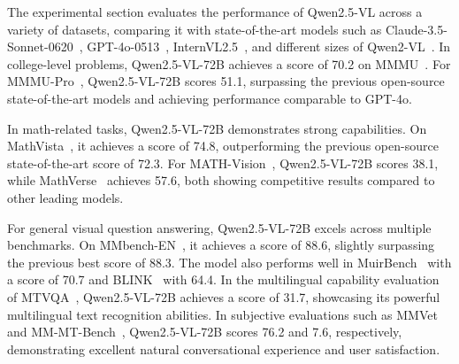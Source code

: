 \begin{table}[h]
{\begin{tabular}{@{}lcccccccc@{}}
\bottomrule
\end{tabular}
}
\end{table}

The experimental section evaluates the performance of Qwen2.5-VL across a variety of datasets, comparing it with state-of-the-art models such as Claude-3.5-Sonnet-0620~\citep{sonnet3_5}, GPT-4o-0513~\citep{gpt4o}, InternVL2.5~\citep{chen2024expanding}, and different sizes of Qwen2-VL~\citep{Qwen2-VL}. In college-level problems, Qwen2.5-VL-72B achieves a score of 70.2 on MMMU~\citep{yue2023mmmu}. For MMMU-Pro~\citep{mmmupro}, Qwen2.5-VL-72B scores 51.1, surpassing the previous open-source state-of-the-art models and achieving performance comparable to GPT-4o.

In math-related tasks, Qwen2.5-VL-72B demonstrates strong capabilities. On MathVista~\citep{mathvista}, it achieves a score of 74.8, outperforming the previous open-source state-of-the-art score of 72.3. For MATH-Vision~\citep{mathvision}, Qwen2.5-VL-72B scores 38.1, while MathVerse~\citep{zhang2024mathverse} achieves 57.6, both showing competitive results compared to other leading models.

For general visual question answering, Qwen2.5-VL-72B excels across multiple benchmarks. On MMbench-EN~\citep{MMBench}, it achieves a score of 88.6, slightly surpassing the previous best score of 88.3. The model also performs well in MuirBench~\citep{wang2024muirbench} with a score of 70.7 and BLINK~\citep{fu2024blink} with 64.4. In the multilingual capability evaluation of MTVQA~\citep{tang2024mtvqa}, Qwen2.5-VL-72B achieves a score of 31.7, showcasing its powerful multilingual text recognition abilities. In subjective evaluations such as MMVet~\citep{yu2024mm} and MM-MT-Bench~\citep{agrawal2024pixtral}, Qwen2.5-VL-72B scores 76.2 and 7.6, respectively, demonstrating excellent natural conversational experience and user satisfaction.


